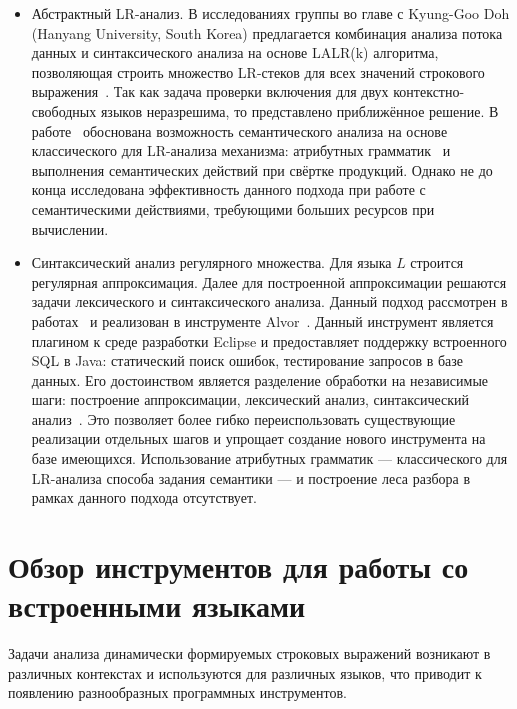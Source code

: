 \begin{itemize}
    \item Абстрактный LR-анализ. В исследованиях группы во главе с Kyung-Goo Doh (Hanyang University, South Korea) предлагается комбинация анализа потока данных и синтаксического анализа на основе LALR(k) алгоритма, позволяющая строить множество LR-стеков для всех значений строкового выражения~\cite{LrAbstract1, LrAbstract2, LRAbstractParsingSema}. Так как задача проверки включения для двух контекстно-свободных языков неразрешима, то представлено приближённое решение. В работе~\cite{LRAbstractParsingSema} обоснована возможность семантического анализа на основе классического для LR-анализа механизма: атрибутных грамматик~\cite{Dragon} и выполнения семантических действий при свёртке продукций. Однако не до конца исследована эффективность данного подхода при работе с семантическими действиями, требующими больших ресурсов при вычислении.

    \item Синтаксический анализ регулярного множества. Для языка $L$ строится регулярная аппроксимация. Далее для построенной аппроксимации решаются задачи лексического и синтаксического анализа. Данный подход рассмотрен в работах~\cite{Alvor1, Alvor2} и реализован в инструменте Alvor~\cite{AlvorUrl}. Данный инструмент является плагином к среде разработки Eclipse и предоставляет поддержку встроенного SQL в Java: статический поиск ошибок, тестирование запросов в базе данных. Его достоинством является разделение обработки на независимые шаги: построение аппроксимации, лексический анализ, синтаксический анализ~\cite{Alvor2}. Это позволяет более гибко переиспользовать существующие реализации отдельных шагов и упрощает создание нового инструмента на базе имеющихся. Использование атрибутных грамматик --- классического для LR-анализа способа задания семантики --- и построение леса разбора в рамках данного подхода отсутствует.

\end{itemize}


\section{Обзор инструментов для работы со встроенными языками}\label{SELToolsDescr}

    Задачи анализа динамически формируемых строковых выражений возникают в различных контекстах и используются для различных языков, что приводит к появлению разнообразных программных инструментов.


